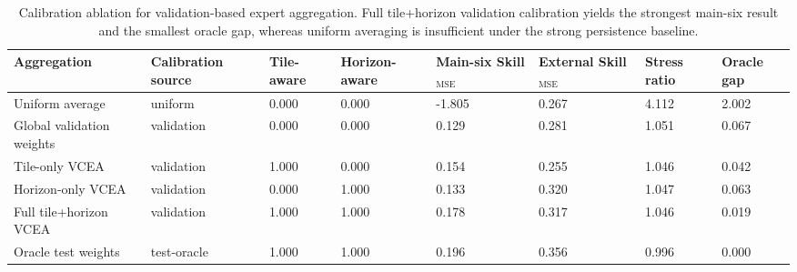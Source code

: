 \begin{table}[t]
\centering
\footnotesize
\begin{tabular}{llllllll}
\toprule
Aggregation & Calibration source & Tile-aware & Horizon-aware & Main-six Skill$_{\mathrm{MSE}}$ & External Skill$_{\mathrm{MSE}}$ & Stress ratio & Oracle gap \\
\midrule
Uniform average & uniform & 0.000 & 0.000 & -1.805 & 0.267 & 4.112 & 2.002 \\
Global validation weights & validation & 0.000 & 0.000 & 0.129 & 0.281 & 1.051 & 0.067 \\
Tile-only VCEA & validation & 1.000 & 0.000 & 0.154 & 0.255 & 1.046 & 0.042 \\
Horizon-only VCEA & validation & 0.000 & 1.000 & 0.133 & 0.320 & 1.047 & 0.063 \\
Full tile+horizon VCEA & validation & 1.000 & 1.000 & 0.178 & 0.317 & 1.046 & 0.019 \\
Oracle test weights & test-oracle & 1.000 & 1.000 & 0.196 & 0.356 & 0.996 & 0.000 \\
\bottomrule
\end{tabular}
\caption{Calibration ablation for validation-based expert aggregation. Full tile+horizon validation calibration yields the strongest main-six result and the smallest oracle gap, whereas uniform averaging is insufficient under the strong persistence baseline.}
\label{tab:e3_calibration_ablation}
\end{table}
